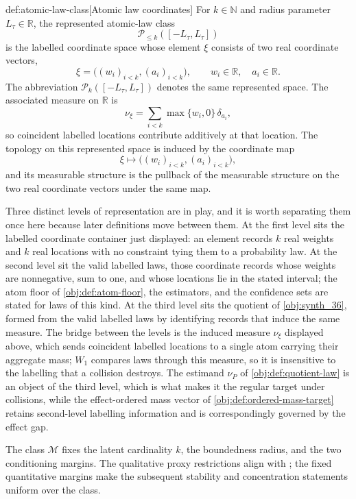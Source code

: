 \begin{definitionv}{def:atomic-law-class}[Atomic law coordinates]
For \(k\in\mathbb N\) and radius parameter \(L_\tau\in\mathbb R\), the represented atomic-law class
\[
\mathcal P_{\le k}([-L_\tau,L_\tau])
\]
is the labelled coordinate space whose element \(\xi\) consists of two real coordinate vectors,
\[
\xi=\bigl((w_i)_{i<k},(a_i)_{i<k}\bigr),
\qquad
w_i\in\mathbb R,\quad a_i\in\mathbb R .
\]
The abbreviation \(\mathcal P_k([-L_\tau,L_\tau])\) denotes the same represented space. The associated measure on \(\mathbb R\) is
\[
\nu_\xi=\sum_{i<k} \max\{w_i,0\}\,\delta_{a_i},
\]
so coincident labelled locations contribute additively at that location. The topology on this represented space is induced by the coordinate map
\[
\xi\mapsto \bigl((w_i)_{i<k},(a_i)_{i<k}\bigr),
\]
and its measurable structure is the pullback of the measurable structure on the two real coordinate vectors under the same map.
\end{definitionv}
Three distinct levels of representation are in play, and it is worth separating them once here because later definitions move between them. At the first level sits the labelled coordinate container just displayed: an element records \(k\) real weights and \(k\) real locations with no constraint tying them to a probability law. At the second level sit the valid labelled laws, those coordinate records whose weights are nonnegative, sum to one, and whose locations lie in the stated interval; the atom floor of \cref{obj:def:atom-floor}, the estimators, and the confidence sets are stated for laws of this kind. At the third level sits the quotient of \cref{obj:synth_36}, formed from the valid labelled laws by identifying records that induce the same measure. The bridge between the levels is the induced measure \(\nu_\xi\) displayed above, which sends coincident labelled locations to a single atom carrying their aggregate mass; \(W_1\) compares laws through this measure, so it is insensitive to the labelling that a collision destroys. The estimand \(\nu_P\) of \cref{obj:def:quotient-law} is an object of the third level, which is what makes it the regular target under collisions, while the effect-ordered mass vector of \cref{obj:def:ordered-mass-target} retains second-level labelling information and is correspondingly governed by the effect gap.


The class \(\mathcal M\) fixes the latent cardinality \(k\), the boundedness radius, and the two conditioning margins. The qualitative proxy restrictions align with \citet{VirkMazaheriWu2026}; the fixed quantitative margins make the subsequent stability and concentration statements uniform over the class.

